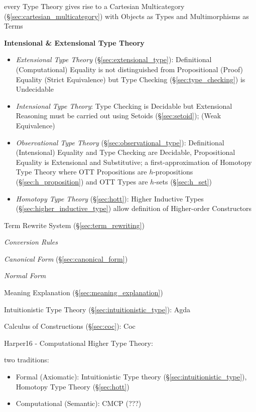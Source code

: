 every Type Theory gives rise to a Cartesian Multicategory
(\S\ref{sec:cartesian_multicategory}) with Objects as Types and
Multimorphisms as Terms



\textbf{Intensional \& Extensional Type Theory}

\begin{itemize}
\item \emph{Extensional Type Theory} (\S\ref{sec:extensional_type}):
  Definitional (Computational) Equality is not distinguished from
  Propositional (Proof) Equality (Strict Equivalence) but Type Checking
  (\S\ref{sec:type_checking}) is Undecidable

\item \emph{Intensional Type Theory}: Type Checking is Decidable but
  Extensional Reasoning must be carried out using Setoids
  (\S\ref{sec:setoid}); (Weak Equivalence)

\item \emph{Observational Type Theory}
  (\S\ref{sec:observational_type}): Definitional (Intensional)
  Equality and Type Checking are Decidable, Propositional Equality is
  Extensional and Substitutive; a first-approximation of Homotopy Type
  Theory where OTT Propositions are $h$-propositions
  (\S\ref{sec:h_proposition}) and OTT Types are $h$-sets
  (\S\ref{sec:h_set})

\item \emph{Homotopy Type Theory} (\S\ref{sec:hott}):
  Higher Inductive Types (\S\ref{sec:higher_inductive_type}) allow
  definition of Higher-order Constructors
\end{itemize}

Term Rewrite System (\S\ref{sec:term_rewriting})

\emph{Conversion Rules}

\emph{Canonical Form} (\S\ref{sec:canonical_form})

\emph{Normal Form}


Meaning Explanation (\S\ref{sec:meaning_explanation})


\asterism


Intuitionistic Type Theory (\S\ref{sec:intuitionistic_type}): Agda

Calculus of Constructions (\S\ref{sec:coc}): Coc


\asterism

Harper16 - Computational Higher Type Theory:

two traditions:

\begin{itemize}
  \item Formal (Axiomatic): Intuitionistic Type theory
    (\S\ref{sec:intuitionistic_type}), Homotopy Type Theory
    (\S\ref{sec:hott})
  \item Computational (Semantic): CMCP (???) %
\end{itemize}

